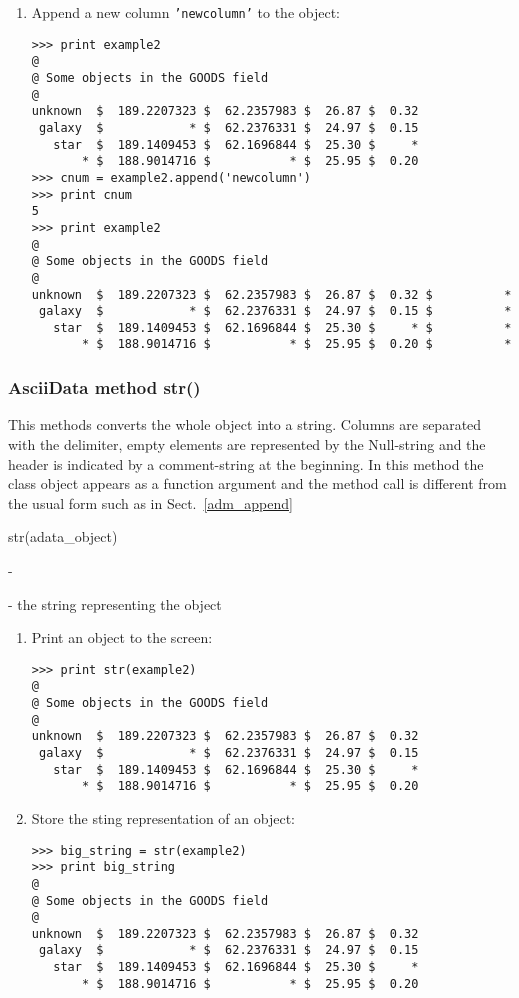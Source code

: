\begin{enumerate}
\item Append a new column {\tt 'newcolumn'} to the \ad object:
\begin{small}
\begin{verbatim}
>>> print example2
@
@ Some objects in the GOODS field
@
unknown  $  189.2207323 $  62.2357983 $  26.87 $  0.32
 galaxy  $            * $  62.2376331 $  24.97 $  0.15
   star  $  189.1409453 $  62.1696844 $  25.30 $     *
       * $  188.9014716 $           * $  25.95 $  0.20
>>> cnum = example2.append('newcolumn')
>>> print cnum
5
>>> print example2
@
@ Some objects in the GOODS field
@
unknown  $  189.2207323 $  62.2357983 $  26.87 $  0.32 $          *
 galaxy  $            * $  62.2376331 $  24.97 $  0.15 $          *
   star  $  189.1409453 $  62.1696844 $  25.30 $     * $          *
       * $  188.9014716 $           * $  25.95 $  0.20 $          *
\end{verbatim}
\end{small}
\end{enumerate}


\subsubsection{AsciiData method str()}
\label{adm_str}
This methods converts the whole \ad object into a string.
Columns are separated with the delimiter, empty elements are represented
by the Null-string and the header is indicated by a comment-string at
the beginning. In this method the class object appears as a function
argument and the method call is different from the usual form such as
in Sect.\ \ref{adm_append}

str(adata\_object)

-

- the string representing the \ad object

\begin{enumerate}
\item Print an \ad object to the screen:
\begin{verbatim}
>>> print str(example2)
@
@ Some objects in the GOODS field
@
unknown  $  189.2207323 $  62.2357983 $  26.87 $  0.32
 galaxy  $            * $  62.2376331 $  24.97 $  0.15
   star  $  189.1409453 $  62.1696844 $  25.30 $     *
       * $  188.9014716 $           * $  25.95 $  0.20
\end{verbatim}
\item Store the sting representation of an \ad object:
\begin{verbatim}
>>> big_string = str(example2)
>>> print big_string
@
@ Some objects in the GOODS field
@
unknown  $  189.2207323 $  62.2357983 $  26.87 $  0.32
 galaxy  $            * $  62.2376331 $  24.97 $  0.15
   star  $  189.1409453 $  62.1696844 $  25.30 $     *
       * $  188.9014716 $           * $  25.95 $  0.20
\end{verbatim}
\end{enumerate}

